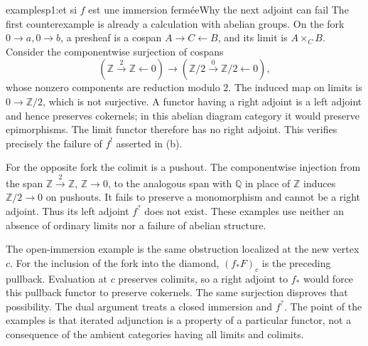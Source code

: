 \begin{dcomment}{examples}{p1:et si $f$ est une immersion fermée}{Why the next adjoint can fail}
The first counterexample is already a calculation with abelian groups. On the fork $0\to a,0\to b$, a presheaf is a cospan $A\to C\leftarrow B$, and its limit is $A\times_C B$. Consider the componentwise surjection of cospans
\[
 (\mathbb Z\xrightarrow{2}\mathbb Z\leftarrow0)
 \longrightarrow
 (\mathbb Z/2\xrightarrow{0}\mathbb Z/2\leftarrow0),
\]
whose nonzero components are reduction modulo $2$. The induced map on limits is $0\to\mathbb Z/2$, which is not surjective. A functor having a right adjoint is a left adjoint and hence preserves cokernels; in this abelian diagram category it would preserve epimorphisms. The limit functor therefore has no right adjoint. This verifies precisely the failure of $f^!$ asserted in (b).

For the opposite fork the colimit is a pushout. The componentwise injection from the span $\mathbb Z\xrightarrow{2}\mathbb Z$, $\mathbb Z\to0$, to the analogous span with $\mathbb Q$ in place of $\mathbb Z$ induces $\mathbb Z/2\to0$ on pushouts. It fails to preserve a monomorphism and cannot be a right adjoint. Thus its left adjoint $f^?$ does not exist. These examples use neither an absence of ordinary limits nor a failure of abelian structure.

The open-immersion example is the same obstruction localized at the new vertex $c$. For the inclusion of the fork into the diamond, $(f_*F)_c$ is the preceding pullback. Evaluation at $c$ preserves colimits, so a right adjoint to $f_*$ would force this pullback functor to preserve cokernels. The same surjection disproves that possibility. The dual argument treats a closed immersion and $f^?$. The point of the examples is that iterated adjunction is a property of a particular functor, not a consequence of the ambient categories having all limits and colimits.
\end{dcomment}


